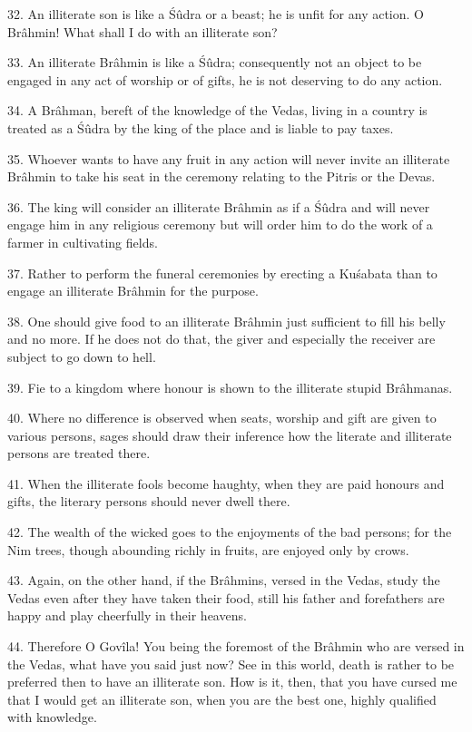 32. An illiterate son is like a \'Sûdra or a beast; he is unfit for any action. O Br\^ahmin! What shall I do with an illiterate son?

33. An illiterate Br\^ahmin is like a \'Sûdra; consequently not an object to be engaged in any act of worship or of gifts, he is not deserving to do any action.

34. A Br\^ahman, bereft of the knowledge of the Vedas, living in a country is treated as a \'Sûdra by the king of the place and is liable to pay taxes.

35. Whoever wants to have any fruit in any action will never invite an illiterate Br\^ahmin to take his seat in the ceremony relating to the Pitris or the Devas.

36. The king will consider an illiterate Br\^ahmin as if a \'Sûdra and will never engage him in any religious ceremony but will order him to do the work of a farmer in cultivating fields.

37. Rather to perform the funeral ceremonies by erecting a Ku\'sabata than to engage an illiterate Br\^ahmin for the purpose.

38. One should give food to an illiterate Br\^ahmin just sufficient to fill his belly and no more. If he does not do that, the giver and especially the receiver are subject to go down to hell.

39. Fie to a kingdom where honour is shown to the illiterate stupid Br\^ahmanas.

40. Where no difference is observed when seats, worship and gift are given to various persons, sages should draw their inference how the literate and illiterate persons are treated there.

41. When the illiterate fools become haughty, when they are paid honours and gifts, the literary persons should never dwell there.

42. The wealth of the wicked goes to the enjoyments of the bad persons; for the Nim trees, though abounding richly in fruits, are enjoyed only by crows.

43. Again, on the other hand, if the Br\^ahmins, versed in the Vedas, study the Vedas even after they have taken their food, still his father and forefathers are happy and play cheerfully in their heavens.

44. Therefore O Gov\^ila! You being the foremost of the Br\^ahmin who are versed in the Vedas, what have you said just now? See in this world, death is rather to be preferred then to have an illiterate son. How is it, then, that you have cursed me that I would get an illiterate son, when you are the best one, highly qualified with knowledge.

